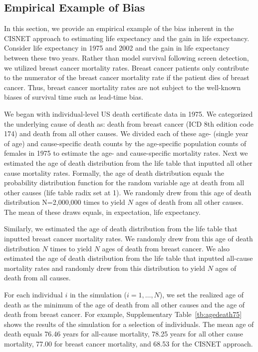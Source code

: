 \documentclass[11pt,letterpaper]{article}
\theoremstyle{plain}
\begin{document}
\subsection{Empirical Example of Bias}
In this section, we provide an empirical example of the bias inherent
in the CISNET approach to estimating life expectancy and the gain in
life expectancy.  Consider life expectancy in 1975 and 2002 and the
gain in life expectancy between these two years.  Rather than model
survival following screen detection, we utilized breast cancer
mortality rates.  Breast cancer patients only contribute to the
numerator of the breast cancer mortality rate if the patient dies of
breast cancer.  Thus, breast cancer mortality rates are not subject to the
well-known biases of survival time such as lead-time bias.

We began with individual-level US death certificate data in 1975.  We
categorized the underlying cause of death as: death from breast cancer
(ICD 8th edition code 174) and death from all other causes.  We
divided each of these age- (single year of age) and cause-specific
death counts by the age-specific population counts of females in 1975
to estimate the age- and cause-specific mortality rates.  Next we
estimated the age of death distribution from the life table that
inputted all other cause mortality rates.  Formally, the age of death
distribution equals the probability distribution function for the
random variable age at death from all other causes (life table radix
set at 1).  We randomly drew from this age of death distribution
N=2,000,000 times to yield $N$ ages of death from all other causes.
The mean of these draws equals, in expectation, life expectancy.

Similarly, we estimated the age of death distribution from the life
table that inputted breast cancer mortality rates.   We randomly drew
from this age of death distribution $N$ times to yield $N$ ages of
death from breast cancer.  We also estimated the age of death
distribution from the life table that inputted all-cause mortality
rates and randomly drew from this distribution to yield $N$ ages of
death from all causes.

For each individual $i$ in the simulation ($i=1,\dots,N$), we set the
realized age of death as the minimum of the age of death from all
other causes and the age of death from breast cancer.  For example,
Supplementary Table~\ref{tb:agedeath75} shows the results of the
simulation for a selection of individuals.  The mean age of death
equals 76.46 years for all-cause mortality, 78.25 years for all other
cause mortality, 77.00 for breast cancer mortality, and 68.53 for the
CISNET approach.
\end{document}
